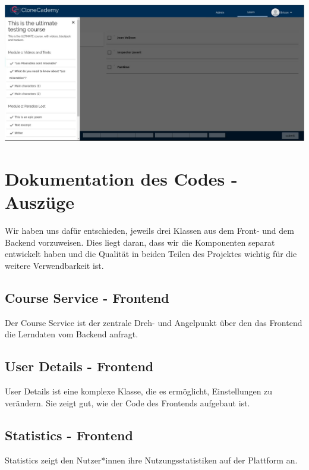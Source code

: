\documentclass[accentcolor=tud0b,12pt,paper=a4]{tudreport}
\begin{document}
\includegraphics[height=0.3\textheight]{appendix/screenshots/question-0.jpeg}



\chapter*{Dokumentation des Codes - Auszüge}

Wir haben uns dafür entschieden, jeweils drei Klassen aus dem Front- und dem Backend vorzuweisen. Dies liegt daran, dass wir die Komponenten separat entwickelt haben und die Qualität in beiden Teilen des Projektes wichtig für die weitere Verwendbarkeit ist.

\section*{Course Service - Frontend}
Der Course Service ist der zentrale Dreh- und Angelpunkt über den das Frontend die Lerndaten vom Backend anfragt.



\section*{User Details - Frontend}
User Details ist eine komplexe Klasse, die es ermöglicht, Einstellungen zu verändern. Sie zeigt gut, wie der Code des Frontends aufgebaut ist.



\section*{Statistics - Frontend}
Statistics zeigt den Nutzer*innen ihre Nutzungsstatistiken auf der Plattform an. 


\end{document}
